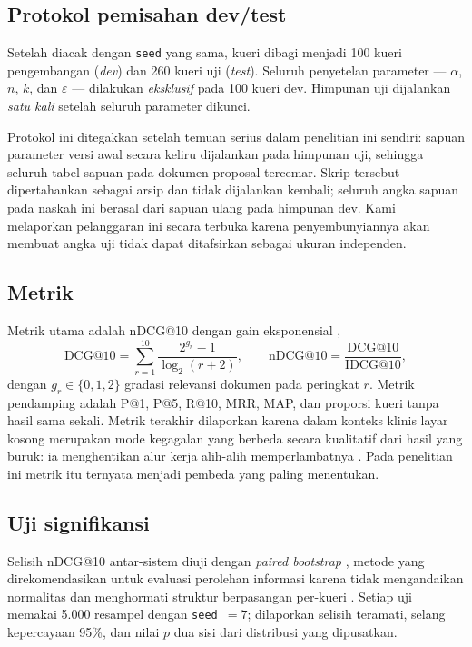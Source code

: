 \documentclass[journal,twoside,web]{ieeecolor}
\begin{document}
\subsection{Protokol pemisahan dev/test}

Setelah diacak dengan \texttt{seed} yang sama, kueri dibagi menjadi 100 kueri
pengembangan (\emph{dev}) dan 260 kueri uji (\emph{test}). Seluruh penyetelan
parameter --- $\alpha$, $n$, $k$, dan $\varepsilon$ --- dilakukan
\emph{eksklusif} pada 100 kueri dev. Himpunan uji dijalankan \emph{satu kali}
setelah seluruh parameter dikunci.

Protokol ini ditegakkan setelah temuan serius dalam penelitian ini sendiri:
sapuan parameter versi awal secara keliru dijalankan pada himpunan uji, sehingga
seluruh tabel sapuan pada dokumen proposal tercemar. Skrip tersebut dipertahankan
sebagai arsip dan tidak dijalankan kembali; seluruh angka sapuan pada naskah ini
berasal dari sapuan ulang pada himpunan dev. Kami melaporkan pelanggaran ini
secara terbuka karena penyembunyiannya akan membuat angka uji tidak dapat
ditafsirkan sebagai ukuran independen.

\subsection{Metrik}

Metrik utama adalah nDCG@10 dengan gain eksponensial \cite{jarvelin2002},
\begin{equation}
\mathrm{DCG@10} = \sum_{r=1}^{10} \frac{2^{g_r} - 1}{\log_2 (r+2)},
\qquad
\mathrm{nDCG@10} = \frac{\mathrm{DCG@10}}{\mathrm{IDCG@10}},
\label{eq:ndcg}
\end{equation}
dengan $g_r \in \{0,1,2\}$ gradasi relevansi dokumen pada peringkat $r$. Metrik
pendamping adalah P@1, P@5, R@10, MRR, MAP, dan proporsi kueri tanpa hasil sama
sekali. Metrik terakhir dilaporkan karena dalam konteks klinis layar kosong
merupakan mode kegagalan yang berbeda secara kualitatif dari hasil yang buruk:
ia menghentikan alur kerja alih-alih memperlambatnya \cite{hersh2020}. Pada
penelitian ini metrik itu ternyata menjadi pembeda yang paling menentukan.

\subsection{Uji signifikansi}

Selisih nDCG@10 antar-sistem diuji dengan \emph{paired bootstrap}
\cite{efron1979}, metode yang direkomendasikan untuk evaluasi perolehan informasi
karena tidak mengandaikan normalitas dan menghormati struktur berpasangan
per-kueri \cite{smucker2007, sakai2006}. Setiap uji memakai 5.000 resampel dengan
\texttt{seed}~$=7$; dilaporkan selisih teramati, selang kepercayaan 95\%, dan
nilai $p$ dua sisi dari distribusi yang dipusatkan.
\end{document}
